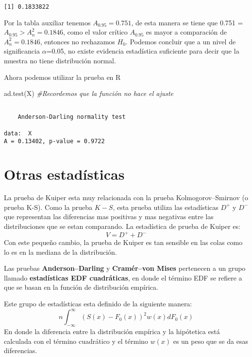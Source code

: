 \documentclass[
  a4paper,
  oneside,
  openany]{book}
\newenvironment{Shaded}{\begin{snugshade}}{\end{snugshade}}
\newcommand{\CommentTok}[1]{\textcolor[rgb]{0.56,0.35,0.01}{\textit{#1}}}
\newcommand{\FunctionTok}[1]{\textcolor[rgb]{0.00,0.00,0.00}{#1}}
\newcommand{\NormalTok}[1]{#1}
\begin{document}
\begin{verbatim}
[1] 0.1833822
\end{verbatim}

Por la tabla auxiliar tenemos \(A_{0.95}=0.751\), de esta manera se tiene que 0.751 = \(A_{0.95} > A_{n}^2=0.1846\), como el valor crítico \(A_{0.95}\) es mayor a comparación de \(A_{n}^2=0.1846\), entonces no rechazamos \(H_0\). Podemos concluir que a un nivel de significancia \(\alpha\)=0.05, no existe evidencia estadística suficiente para decir que la muestra no tiene distribución normal.

Ahora podemos utilizar la prueba en R

\begin{Shaded}
\begin{Highlighting}[]
\FunctionTok{ad.test}\NormalTok{(X)   }\CommentTok{\#Recordemos que la función no hace el ajuste}
\end{Highlighting}
\end{Shaded}

\begin{verbatim}

    Anderson-Darling normality test

data:  X
A = 0.13402, p-value = 0.9722
\end{verbatim}

\hypertarget{otras-estaduxedsticas}{%
\chapter{Otras estadísticas}\label{otras-estaduxedsticas}}

La prueba de Kuiper esta muy relacionada con la prueba Kolmogorov--Smirnov (o prueba K-S). Como la prueba \(K-S\), esta prueba utiliza las estadísticas \(D^+\) y \(D^-\) que representan las diferencias mas positivas y mas negativas entre las distribuciones que se estan comparando. La estadística de prueba de Kuiper es:
\[V=D^+ + D^-\]
Con este pequeño cambio, la prueba de Kuiper es tan sensible en las colas como lo es en la mediana de la distribución.

Las pruebas \textbf{Anderson--Darling} y \textbf{Cramér--von Mises} pertenecen a un grupo llamado \textbf{estadísticas EDF cuadráticas}, en donde el término EDF se refiere a que se basan en la función de distribución empírica.

Este grupo de estadísticas esta definido de la siguiente manera:
\[n\int_{-\infty}^{\infty}(S(x)-F_0(x))^2w(x)dF_0(x)\]
En donde la diferencia entre la distribución empírica y la hipótetica está calculada con el término cuadrático y el término \(w(x)\) es un peso que se da esas diferencias.
\end{document}
